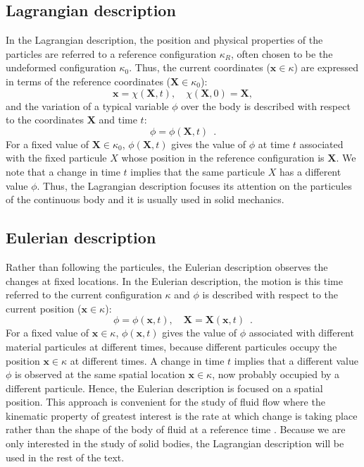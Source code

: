 	\subsection{Lagrangian description}
In the Lagrangian description, the position and physical properties of the particles are referred to a reference configuration $\kappa_{R}$, often chosen to be the undeformed configuration $\kappa_{0}$. Thus, the current coordinates ($\textbf{x} \in \kappa$) are expressed in terms of the reference coordinates ($\textbf{X} \in \kappa_{0}$): 
\begin{equation}
\textbf{x} = \chi(\textbf{X}, t), \quad \chi(\textbf{X}, 0) = \textbf{X},
\end{equation}
and the variation of a typical variable $\phi$ over the body is described with respect to the coordinates $\textbf{X}$ and time $t$:
\begin{equation}
\phi = \phi(\textbf{X}, t) \enspace .
\end{equation}
For a fixed value of $\textbf{X} \in \kappa_{0}$, $\phi(\textbf{X},t)$ gives the value of $\phi$ at time $t$ associated with the fixed particule $X$ whose position in the reference configuration is $\textbf{X}$. We note that a change in time $t$ implies that the same particule $X$ has a different value $\phi$. Thus, the Lagrangian description focuses its attention on the particules of the continuous body and it is usually used in solid mechanics.
	
	\subsection{Eulerian description}
Rather than following the particules, the Eulerian description observes the changes at fixed locations. 	In the Eulerian description, the motion is this time referred to the current configuration $\kappa$ and $\phi$ is described with respect to the current position ($\textbf{x} \in \kappa$):
\begin{equation}
\phi = \phi(\textbf{x}, t), \quad \textbf{X} = \textbf{X}(\textbf{x}, t) \enspace .
\end{equation}
For a fixed value of $\textbf{x} \in \kappa$, $\phi(\textbf{x},t)$ gives the value of $\phi$ associated with different material particules at different times, because different particules occupy the position $\textbf{x} \in \kappa$ at different times. A change in time $t$ implies that a different value $\phi$ is observed at the same spatial location $\textbf{x} \in \kappa$, now probably occupied by a different particule. Hence, the Eulerian description is focused on a spatial position. 	This approach is convenient for the study of fluid flow where the kinematic property of greatest interest is the rate at which change is taking place rather than the shape of the body of fluid at a reference time \citep{Spencer80}. Because we are only interested in the study of solid bodies, the Lagrangian description will be used in the rest of the text. 
	
